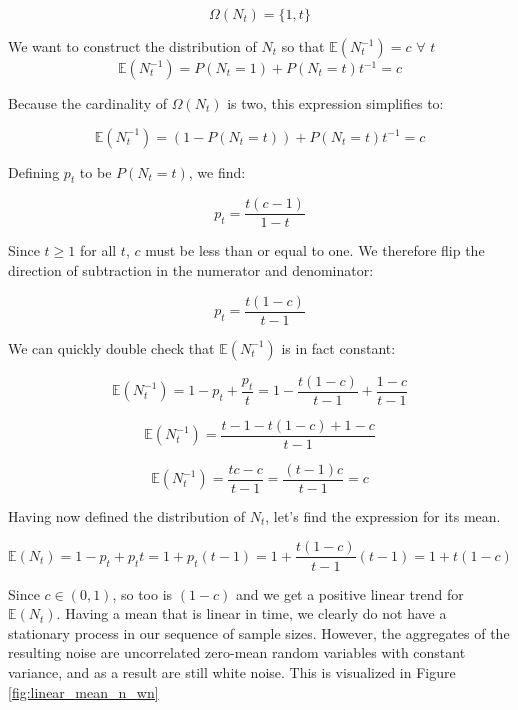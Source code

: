 $$ \Omega(N_t) = \{1,t\} $$

We want to construct the distribution of $N_t$ so that $\mathbb{E}(N_t^{-1}) = c$ $\forall$ $t$
$$ \mathbb{E}(N_t^{-1}) = P(N_t=1) + P(N_t=t)t^{-1} = c $$

Because the cardinality of $\Omega(N_t)$ is two, this expression simplifies to:

$$ \mathbb{E}(N_t^{-1}) = (1-P(N_t=t)) + P(N_t=t)t^{-1} = c $$

Defining $p_t$ to be $P(N_t = t)$, we find:




$$ p_t = \frac{t(c-1)}{1-t} $$

Since $t \geq 1$ for all $t$, $c$ must be less than or equal to one. We therefore flip the direction of subtraction in the numerator and denominator:

$$ p_t = \frac{t(1-c)}{t-1} $$

We can quickly double check that $\mathbb{E}(N_t^{-1})$ is in fact constant:

$$ \mathbb{E}(N_t^{-1}) = 1-p_t + \frac{p_t}{t} = 1 - \frac{t(1-c)}{t-1} + \frac{1-c}{t-1} $$

$$ \mathbb{E}(N_t^{-1}) = \frac{t-1 - t(1-c) + 1-c}{t-1} $$

$$ \mathbb{E}(N_t^{-1}) = \frac{tc - c}{t-1} = \frac{(t-1)c}{t-1} = c $$

Having now defined the distribution of $N_t$, let's find the expression for its mean.

$$ \mathbb{E}(N_t) = 1-p_t + p_tt = 1 + p_t(t-1) = 1 + \frac{t(1-c)}{t-1}(t-1) = 1 + t(1-c) $$

Since $c\in (0,1)$, so too is $(1-c)$ and we get a positive linear trend for $\mathbb{E}(N_t)$. Having a mean that is linear in time, we clearly do not have a stationary process in our sequence of sample sizes. However, the aggregates of the resulting noise are uncorrelated zero-mean random variables with constant variance, and as a result are still white noise. This is visualized in Figure \ref{fig:linear_mean_n_wn}

